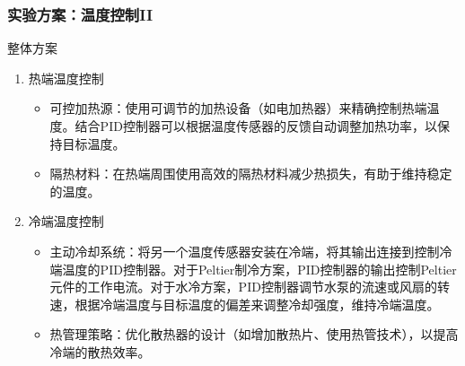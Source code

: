\documentclass[aspectratio=169]{beamer}
\newcounter{currentenumi}
\begin{document}
	\begin{frame}
		\frametitle{实验方案：温度控制II}
		
		\begin{block}{整体方案}
			\begin{enumerate}
				
				\setcounter{enumi}{\thecurrentenumi}
				
				\footnotesize\item 热端温度控制
				\begin{itemize}
					\footnotesize\item 可控加热源：使用可调节的加热设备（如电加热器）来精确控制热端温度。结合\textcolor{c4}{PID控制器}可以根据温度传感器的反馈自动调整加热功率，以保持目标温度。
					\footnotesize\item \textcolor{c4}{隔热材料}：在热端周围使用高效的隔热材料减少热损失，有助于维持稳定的温度。
				\end{itemize}
				
				\footnotesize\item 冷端温度控制
				\begin{itemize}
					\footnotesize\item 主动冷却系统：将另一个温度传感器安装在冷端，将其输出连接到控制冷端温度的\textcolor{c4}{PID控制器}。对于Peltier制冷方案，PID控制器的输出控制Peltier元件的工作电流。对于水冷方案，PID控制器调节水泵的流速或风扇的转速，根据冷端温度与目标温度的偏差来调整冷却强度，维持冷端温度。
					
					\footnotesize\item 热管理策略：优化散热器的设计（如增加散热片、使用热管技术），以提高冷端的散热效率。
				\end{itemize}
	
			\end{enumerate}
		\end{block}
	\end{frame}
	
\end{document}
